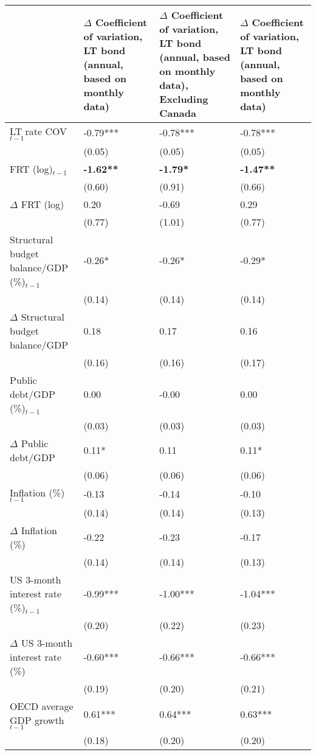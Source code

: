 {\tiny
\begin{tabular}{lp{2cm}p{2cm}p{2cm}}
  \hline
 & $\Delta$ Coefficient of variation, LT bond (annual, based on monthly data) & $\Delta$ Coefficient of variation, LT bond (annual, based on monthly data), \textbf{Excluding Canada} & $\Delta$ Coefficient of variation, LT bond (annual, based on monthly data) \\ 
  \hline
LT rate COV$_{t-1}$ & -0.79*** & -0.78*** & -0.78*** \\ 
   & (0.05) & (0.05) & (0.05) \\ 
  FRT (log)$_{t-1}$ & \textbf{-1.62**} & \textbf{-1.79*} & \textbf{-1.47**} \\ 
   & (0.60) & (0.91) & (0.66) \\ 
  $\Delta$ FRT (log) & 0.20 & -0.69 & 0.29 \\ 
   & (0.77) & (1.01) & (0.77) \\ 
  Structural budget balance/GDP (\%)$_{t-1}$ & -0.26* & -0.26* & -0.29* \\ 
   & (0.14) & (0.14) & (0.14) \\ 
  $\Delta$ Structural budget balance/GDP & 0.18 & 0.17 & 0.16 \\ 
   & (0.16) & (0.16) & (0.17) \\ 
  Public debt/GDP (\%)$_{t-1}$ & 0.00 & -0.00 & 0.00 \\ 
   & (0.03) & (0.03) & (0.03) \\ 
  $\Delta$ Public debt/GDP & 0.11* & 0.11 & 0.11* \\ 
   & (0.06) & (0.06) & (0.06) \\ 
  Inflation (\%) $_{t-1}$ & -0.13 & -0.14 & -0.10 \\ 
   & (0.14) & (0.14) & (0.13) \\ 
  $\Delta$ Inflation (\%) & -0.22 & -0.23 & -0.17 \\ 
   & (0.14) & (0.14) & (0.13) \\ 
  US 3-month interest rate (\%)$_{t-1}$ & -0.99*** & -1.00*** & -1.04*** \\ 
   & (0.20) & (0.22) & (0.23) \\ 
  $\Delta$ US 3-month interest rate (\%) & -0.60*** & -0.66*** & -0.66*** \\ 
   & (0.19) & (0.20) & (0.21) \\ 
  OECD average GDP growth$_{t-1}$ & 0.61*** & 0.64*** & 0.63*** \\ 
   & (0.18) & (0.20) & (0.20) \\ 

\end{tabular}}
